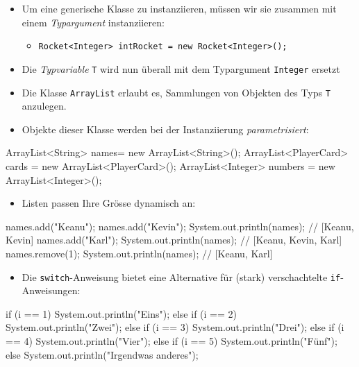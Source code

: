 \documentclass[a4paper,10pt, dvipsnames]{report}
\begin{document}
\begin{itemize}
    \item Um eine generische Klasse zu instanziieren, müssen wir sie zusammen mit einem \textit{Typargument} instanziieren:
    \begin{itemize}
        \item \texttt{Rocket<Integer> intRocket = new Rocket<Integer>();}
    \end{itemize}
    \item Die \textit{Typvariable} \texttt{T} wird nun überall mit dem Typargument \texttt{Integer} ersetzt
    \item Die Klasse \texttt{ArrayList} erlaubt es, Sammlungen von Objekten des Typs \texttt{T} anzulegen.
    \item Objekte dieser Klasse werden bei der Instanziierung \textit{parametrisiert}:
\end{itemize}

\begin{javacodebox}
ArrayList<String> names= new ArrayList<String>();
ArrayList<PlayerCard> cards = new ArrayList<PlayerCard>();
ArrayList<Integer> numbers = new ArrayList<Integer>();
\end{javacodebox}

\begin{itemize}
    \item Listen passen Ihre Grösse dynamisch an:
\end{itemize}

\begin{javacodebox}
names.add("Keanu");
names.add("Kevin");
System.out.println(names); // [Keanu, Kevin]
names.add("Karl");
System.out.println(names); // [Keanu, Kevin, Karl]
names.remove(1);
System.out.println(names); // [Keanu, Karl]
\end{javacodebox}

\begin{itemize}
    \item Die \texttt{switch}-Anweisung bietet eine Alternative für (stark) verschachtelte \texttt{if}-Anweisungen:
\end{itemize}

\begin{javacodebox}
if (i == 1)
    System.out.println("Eins");
else
    if (i == 2)
        System.out.println("Zwei");
    else
        if (i == 3)
            System.out.println("Drei");
        else
            if (i == 4)
                System.out.println("Vier");
            else
                if (i == 5)
                    System.out.println("Fünf");
                 else
                         System.out.println("Irgendwas anderes");
\end{javacodebox}
\end{document}
